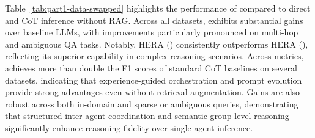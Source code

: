 Table~\ref{tab:part1-data-swapped} highlights the performance of \hero compared to direct and CoT inference without RAG. Across all datasets, \hero exhibits substantial gains over baseline LLMs, with improvements particularly pronounced on multi-hop and ambiguous QA tasks. Notably, HERA (\qwen) consistently outperforms HERA (\llama), reflecting its superior capability in complex reasoning scenarios. Across metrics, \hero achieves more than double the F1 scores of standard CoT baselines on several datasets, indicating that experience-guided orchestration and prompt evolution provide strong advantages even without retrieval augmentation. Gains are also robust across both in-domain and sparse or ambiguous queries, demonstrating that structured inter-agent coordination and semantic group-level reasoning significantly enhance reasoning fidelity over single-agent inference.